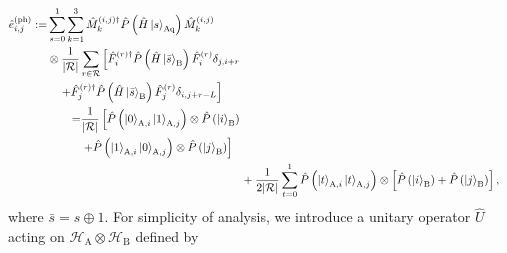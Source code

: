 \documentclass[twocolumn,superscriptaddress,pra,footinbib,notitlepage]{revtex4-1}
\newcommand{\1}{\mbox{1}\hspace{-0.25em}\mbox{l}}
\newcommand{\abs}[1]{\lvert#1\rvert}
\begin{document}
\begin{align}
\begin{split}
\hat{e}_{i, j}^{(\textrm{ph})}:=&\sum_{s=0}^1\sum_{k=1}^3\hat{M}_k^{(i, j)\dagger}\hat{P}\left(\hat{H}\ket{s}_\textrm{Aq}\right)\hat{M}_k^{(i, j)}\\
&\otimes\frac{1}{\abs{\mathcal{R}}}\sum_{r\in\mathcal{R}}\left[\hat{F}_i^{(r)\dagger}\hat{P}\left(\hat{H}\ket{\bar{s}}_\textrm{B}\right)\hat{F}_i^{(r)}\delta_{j, i+r}\right.\\
&\left.\quad+\hat{F}_j^{(r)\dagger}\hat{P}\left(\hat{H}\ket{\bar{s}}_\textrm{B}\right)\hat{F}_j^{(r)}\delta_{i, j+r-L}\right]
\end{split}\nonumber\\
\begin{split}
=&\frac{1}{\abs{\mathcal{R}}}\left[\hat{P}\left(\ket{0}_{\textrm{A}, i}\ket{1}_{\textrm{A}, j}\right)\otimes\hat{P}\left(\ket{i}_\textrm{B}\right)\right.\\
&\left.+\hat{P}\left(\ket{1}_{\textrm{A}, i}\ket{0}_{\textrm{A}, j}\right)\otimes\hat{P}\left(\ket{j}_\textrm{B}\right)\right]
\end{split}\nonumber\\
&+\frac{1}{2\abs{\mathcal{R}}}\sum_{t=0}^1\hat{P}\left(\ket{t}_{\textrm{A}, i}\ket{t}_{\textrm{A}, j}\right)\otimes\left[\hat{P}\left(\ket{i}_\textrm{B}\right)+\hat{P}\left(\ket{j}_\textrm{B}\right)\right],
\label{defi:ephPOVM_ij}
\end{align}
where $\bar{s}=s\oplus1$.
For simplicity of analysis, we introduce a unitary operator $\hat{U}$ acting on $\mathcal{H}_\textrm{A}\otimes\mathcal{H}_\textrm{B}$ defined by
\end{document}
